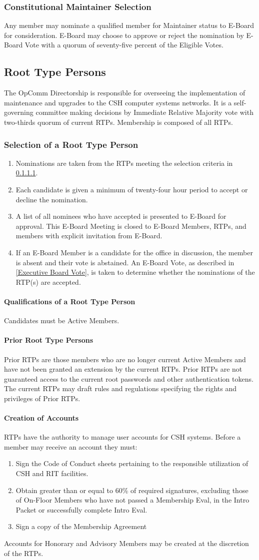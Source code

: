 \documentclass{article}
\newcommand{\asection}[1]{\subsection{#1} \label{#1}}
\newcommand{\asubsection}[1]{\subsubsection{#1} \label{#1}}
\newcommand{\asubsubsection}[1]{\paragraph{#1} \label{#1}}
\begin{document}
\asubsection{Constitutional Maintainer Selection}
Any member may nominate a qualified member for Maintainer status to E-Board for consideration.
E-Board may choose to approve or reject the nomination by E-Board Vote with a quorum of seventy-five percent of the Eligible Votes.

\asection{Root Type Persons}
The OpComm Directorship is responsible for overseeing the implementation of maintenance and upgrades to the CSH computer systems networks.
It is a self-governing committee making decisions by Immediate Relative Majority vote with two-thirds quorum of current RTPs.
Membership is composed of all RTPs.

\asubsection{Selection of a Root Type Person}
\renewcommand{\theenumi}{\alph{enumi}} %
\begin{enumerate}
	\item Nominations are taken from the RTPs meeting the selection criteria in \ref{Qualifications of a Root Type Person}.
	\item Each candidate is given a minimum of twenty-four hour period to accept or decline the nomination.
	\item A list of all nominees who have accepted is presented to E-Board for approval.
	      This E-Board Meeting is closed to E-Board Members, RTPs, and members with explicit invitation from E-Board.
	\item If an E-Board Member is a candidate for the office in discussion, the member is absent and their vote is abstained.
	      An E-Board Vote, as described in \ref{Executive Board Vote}, is taken to determine whether the nominations of the RTP(s) are accepted.
\end{enumerate}

\asubsubsection{Qualifications of a Root Type Person}
Candidates must be Active Members.

\asubsubsection{Prior Root Type Persons}
Prior RTPs are those members who are no longer current Active Members and have not been granted an extension by the current RTPs.
Prior RTPs are not guaranteed access to the current root passwords and other authentication tokens.
The current RTPs may draft rules and regulations specifying the rights and privileges of Prior RTPs.

\asubsubsection{Creation of Accounts}
RTPs have the authority to manage user accounts for CSH systems.
Before a member may receive an account they must:
\renewcommand{\theenumi}{\arabic{enumi}} %
\begin{enumerate}
	\item Sign the Code of Conduct sheets pertaining to the responsible utilization of CSH and RIT facilities.
	\item Obtain greater than or equal to 60\% of required signatures, excluding those of On-Floor Members who have not passed a Membership Eval, in the Intro Packet or successfully complete Intro Eval.
	\item Sign a copy of the Membership Agreement
\end{enumerate}
Accounts for Honorary and Advisory Members may be created at the discretion of the RTPs.
\end{document}
